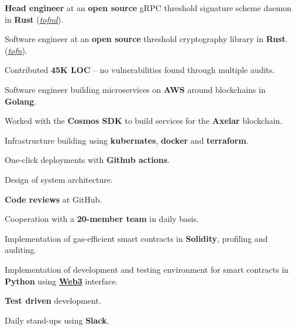 \documentclass[]{deedy-resume-openfont}
\begin{document}
\begin{minipage}[t]{0.66\textwidth}


\vspace{\topsep} %
\begin{tightemize}
\item \textbf{Head engineer} at an \textbf{open source} gRPC threshold signature scheme daemon in \textbf{Rust} (\textit{\href{https://github.com/axelarnetwork/tofnd}{tofnd}}).
\item Software engineer at an \textbf{open source} threshold cryptography library in \textbf{Rust}. (\textit{\href{https://github.com/axelarnetwork/tofn}{tofn}}).
\item Contributed \textbf{45K LOC} -- no vulnerabilities found through multiple audits.
\item Software engineer building microservices on \textbf{AWS} around blockchains in \textbf{Golang}.
\item Worked with the \textbf{Cosmos SDK} to build services for the \textbf{Axelar} blockchain.
\item Infrastructure building using \textbf{kubernates}, \textbf{docker} and \textbf{terraform}.
\item One-click deployments with \textbf{Github actions}.
\item Design of system architecture.
\item \textbf{Code reviews} at GitHub.
\item Cooperation with a \textbf{20-member team} in daily basis.
\end {tightemize}
\sectionsep


\begin{tightemize}
\item Implementation of gas-efficient smart contracts in \textbf{Solidity},
    profiling and auditing.
\item Implementation of development and testing environment for smart contracts
    in \textbf{Python} using
    \textbf{\href{https://web3py.readthedocs.io/en/stable/}{Web3}} interface.
\item \textbf{Test driven} development.
\item Daily stand-ups using \textbf{Slack}.
\end {tightemize}
\sectionsep


\end{minipage}
\end{document}
